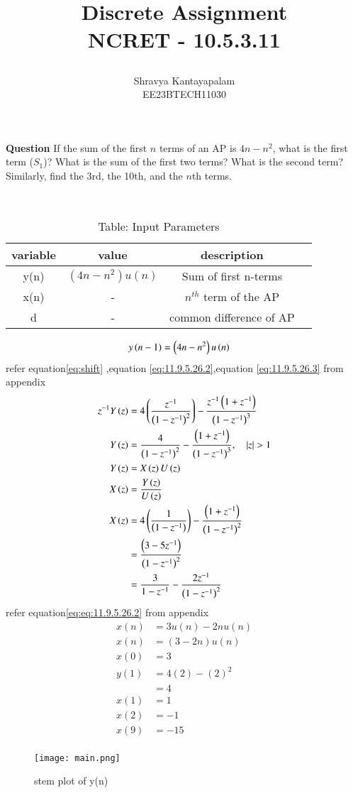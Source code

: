 \documentclass[a4,12pt,onecolumn]{IEEEtran}
\begin{document}
\title{
\Huge\textbf{ Discrete Assignment} \\
\textbf{NCRET - 10.5.3.11}
\author{Shravya Kantayapalam \\EE23BTECH11030}}
\maketitle
\textbf{Question} 
 If the sum of the first $ n $ terms of an AP is $4n - n^2$, what is the first term ($ S_1 $)? What is the sum of the first two terms? What is the second term? Similarly, find the 3rd, the 10th, and the $n$th terms.
 
\solution\\
\begin{table}[ht!]
\begin{center}
\begin{tabular}{|c|c|c|c|}
   \hline
   variable&value&description\\
   \hline 
   y(n)&$(4n-n^2)u(n)$& Sum of first n-terms\\
   \hline
   x(n)&-&$n^{th}$ term of the AP\\
   \hline 
   d&-&common difference of AP\\
   \hline
\end{tabular}
\caption{Table: Input Parameters}
\end{center}
\end{table}
\begin{align}
y\left(n-1\right)&=\left(4n-n^2\right)u\left(n\right)
\end{align}
refer equation\eqref{eq:shift} ,equation \eqref{eq:11.9.5.26.2},equation \eqref{eq:11.9.5.26.3} from appendix
\begin{align}
z^{-1}Y\brak{z} &=4\brak{\frac{z^{-1}}{\brak{1-z^{-1}}^2}}-\frac{z^{-1}\brak{1+z^{-1}}}{\brak{1-z^{-1}}^3}\\
Y\brak{z} &=\frac{4}{\brak{1-z^{-1}}^2}-\frac{\brak{1+z^{-1}}}{\brak{1-z^{-1}}^3},\quad{|z|>1}\\
Y\brak{z}&=X\brak{z}U\brak{z}\\
X\brak{z}&=\frac{Y\brak{z}}{U\brak{z}}\\
X\brak{z}&=4\brak{\frac{1}{\brak{1-z^{-1}}}}-\frac{\brak{1+z^{-1}}}{\brak{1-z^{-1}}^2}\\
&=\frac{\brak{3-5z^{-1}}}{\brak{1-z^{-1}}^2}\\
&=\frac{3}{1-z^{-1}}-\frac{2z^{-1}}{\brak{1-z^{-1}}^2}
\end{align}
refer equation\eqref{eq:eq:11.9.5.26.2} from appendix
\begin{align}
    x(n)&=3u(n)-2nu(n)\\
    x(n)&=(3-2n)u(n)\\
    x(0) &=3\\
   y(1) &= 4(2) - (2)^2\\
    &=4\\
x(1) &= 1 \\
x(2) &= -1 \\
x(9) &= -15 \\
\end{align}
\begin{figure}[ht!]
\texttt{[image: main.png]}
\caption{\large{stem plot of y(n)}}
\end{figure}
\end{document}
